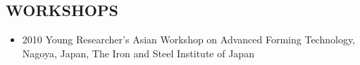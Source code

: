 \documentclass{res}
\begin{document}
\begin{resume}
  \section{WORKSHOPS}
  \begin{itemize}
  \item 2010 Young Researcher's Asian Workshop on Advanced Forming Technology, Nagoya, Japan, The Iron and Steel Institute of Japan
  \end{itemize}


\end{resume}
\end{document}
